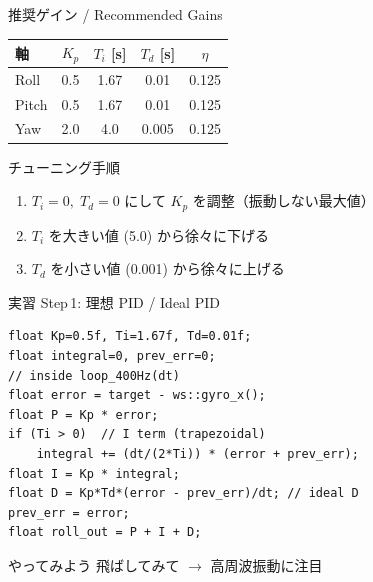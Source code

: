 \documentclass[aspectratio=169, 14pt]{beamer}
\begin{document}
\begin{frame}{推奨ゲイン / Recommended Gains}
  \begin{table}
    \centering
    \begin{tabular}{lcccc}
      \hline
      \textbf{軸} & \textbf{$K_p$} & \textbf{$T_i$ [s]} & \textbf{$T_d$ [s]} & \textbf{$\eta$} \\
      \hline
      Roll  & 0.5 & 1.67 & 0.01  & 0.125 \\
      Pitch & 0.5 & 1.67 & 0.01  & 0.125 \\
      Yaw   & 2.0 & 4.0  & 0.005 & 0.125 \\
      \hline
    \end{tabular}
  \end{table}

  \vspace{0.5em}

  \begin{block}{チューニング手順}
    \begin{enumerate}
      \item $T_i{=}0,\; T_d{=}0$ にして $K_p$ を調整（振動しない最大値）
      \item $T_i$ を大きい値 (5.0) から徐々に下げる
      \item $T_d$ を小さい値 (0.001) から徐々に上げる
    \end{enumerate}
  \end{block}
\end{frame}

\begin{frame}[fragile]{実習 Step\,1: 理想 PID / Ideal PID}
  \begin{lstlisting}[style=sfcpp, title={user\_code.cpp (roll axis excerpt)}]
float Kp=0.5f, Ti=1.67f, Td=0.01f;
float integral=0, prev_err=0;
// inside loop_400Hz(dt)
float error = target - ws::gyro_x();
float P = Kp * error;
if (Ti > 0)  // I term (trapezoidal)
    integral += (dt/(2*Ti)) * (error + prev_err);
float I = Kp * integral;
float D = Kp*Td*(error - prev_err)/dt; // ideal D
prev_err = error;
float roll_out = P + I + D;
  \end{lstlisting}

  \begin{exampleblock}{やってみよう}
    飛ばしてみて $\to$ 高周波振動に注目
  \end{exampleblock}
\end{frame}
\end{document}
